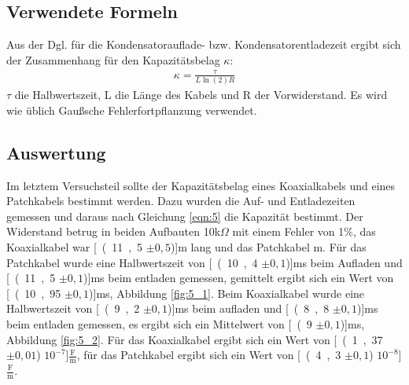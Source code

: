\documentclass[12pt,a4paper]{article}
\begin{document}
\subsection{Verwendete Formeln}
Aus der Dgl. für die Kondensatorauflade- bzw. Kondensatorentladezeit ergibt sich der Zusammenhang für den Kapazitätsbelag $\kappa$:
\begin{align}
 \kappa = \frac{\tau}{L \ln(2) R}
 \label{eqn:5}
\end{align}
$\tau$ die Halbwertszeit, L die Länge des Kabels und R der Vorwiderstand. Es wird wie üblich Gaußsche Fehlerfortpflanzung verwendet.
\subsection{Auswertung}

Im letztem Versuchsteil sollte der Kapazitätsbelag eines Koaxialkabels und eines Patchkabels bestimmt werden.
Dazu wurden die Auf- und Entladezeiten gemessen und daraus nach Gleichung \ref{eqn:5} die Kapazität bestimmt.
Der Widerstand betrug in beiden Aufbauten 10k$\Omega$ mit einem Fehler von 1\%, das Koaxialkabel war \unit[(11,5 $\pm 0,5$)]{m} lang und das Patchkabel \unit[30]{m}. Für das Patchkabel wurde eine Halbwertszeit von \unit[(10,4 $\pm 0,1$)]{ms} beim Aufladen und \unit[(11,5 $\pm 0,1$)]{ms} beim entladen gemessen, gemittelt ergibt sich ein Wert von \unit[(10,95 $\pm 0,1$)]{ms}, Abbildung \ref{fig:5_1}. Beim Koaxialkabel wurde eine Halbwertszeit von \unit[(9,2 $\pm 0,1$)]{ms} beim aufladen und \unit[(8,8 $\pm 0,1$)]{ms} beim entladen gemessen, es ergibt sich ein Mittelwert von \unit[(9 $\pm 0,1$)]{ms}, Abbildung \ref{fig:5_2}.
Für das Koaxialkabel ergibt sich ein Wert von \unit[(1,37 $\pm 0,01$) $10^{-7}$]{$\frac{\text{F}}{\text{m}}$}, für das Patchkabel ergibt sich ein Wert von \unit[(4,3 $\pm 0,1$) $10^{-8}$]{$\frac{\text{F}}{\text{m}}$}.
\end{document}
